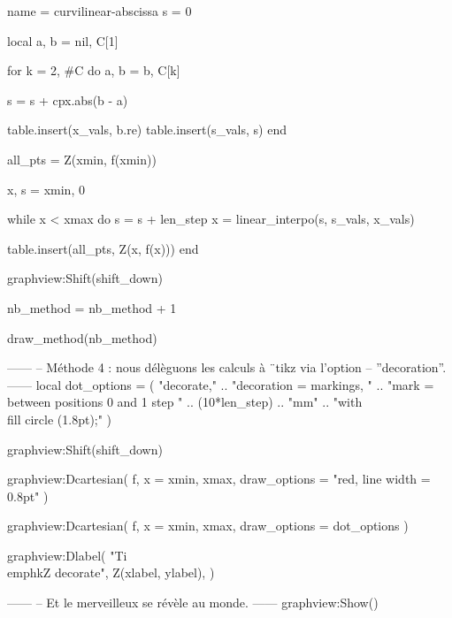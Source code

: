 \documentclass{standalone}
\begin{document}
\begin{luadraw}{name = curvilinear-abscissa}
s = 0

local a, b = nil, C[1]

for k = 2, #C do
  a, b = b, C[k]

  s = s + cpx.abs(b - a)

  table.insert(x_vals, b.re)
  table.insert(s_vals, s)
end

all_pts = {Z(xmin, f(xmin))}

x, s = xmin, 0

while x < xmax do
  s = s + len_step
  x = linear_interpo(s, s_vals, x_vals)

  table.insert(all_pts, Z(x, f(x)))
end

graphview:Shift(shift_down)

nb_method = nb_method + 1

draw_method(nb_method)

------
-- Méthode 4 : nous délèguons les calculs à ¨tikz via l'option
-- ''decoration''.
------
local dot_options = (
     "decorate,"
  .. "decoration = {markings, "
  .. "mark = between positions 0 and 1 step "
  .. (10*len_step) .. "mm"
  .. "with {\\fill circle (1.8pt);}}"
)

graphview:Shift(shift_down)

graphview:Dcartesian(
  f,
  {
    x = {xmin, xmax},
    draw_options = "red, line width = 0.8pt"
  }
)

graphview:Dcartesian(
  f,
  {
    x = {xmin, xmax},
    draw_options = dot_options
  }
)

graphview:Dlabel(
  "Ti\\emph{k}Z decorate", Z(xlabel, ylabel), {}
)

------
-- Et le merveilleux se révèle au monde.
------
graphview:Show()
\end{luadraw}
\end{document}
